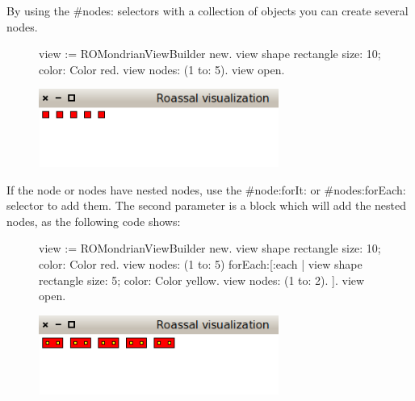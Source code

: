 \documentclass[a4paper,10pt,twoside]{book}
\begin{document}
By using the \#nodes:  selectors with a collection of objects you can create several nodes.

\begin{figure}[H]
      \begin{minipage}[t]{1\textwidth}
      \vspace{0pt}
\begin{code}{}
view := ROMondrianViewBuilder new.
view shape rectangle 
	size: 10;
	color: Color red.
view nodes: (1 to: 5).
view open.
\end{code}
   \end{minipage}
   \hfill
   \begin{minipage}[t]{1\textwidth}
	 \vspace{0pt} \raggedright
       \centering
		\includegraphics[width=0.7\textwidth]{mondrian3}
   \end{minipage}
\label{fig:mondrian3}
\end{figure} 



If the node or nodes have nested nodes, use the \#node:forIt: or \#nodes:forEach: selector to add them. The second parameter is a block which will add the nested nodes, as the following code shows:

\begin{figure}[H]
      \begin{minipage}[t]{1\textwidth}
      \vspace{0pt}
\begin{code}{}
view := ROMondrianViewBuilder new.
view shape rectangle 
	size: 10;
	color: Color red.
view 
	nodes: (1 to: 5) 	
	forEach:[:each |
		view shape rectangle 
			size: 5;
			color: Color yellow.
		view nodes: (1 to: 2).
	].
view open.
\end{code}
   \end{minipage}
   \hfill
   \begin{minipage}[t]{1\textwidth}
	 \vspace{0pt} \raggedright
       \centering
		\includegraphics[width=0.7\textwidth]{mondrian4}
   \end{minipage}
\label{fig:mondrian4}
\end{figure} 
\end{document}
